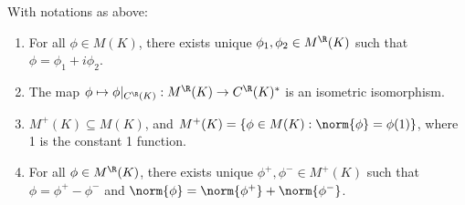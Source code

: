 \documentclass[a4paper]{article}
\begin{document}
\begin{nlemma}\label{lem:C(K)Space}
	With notations as above:
	\begin{enumerate}[label=(\roman*), nosep]
		\item For all $\phi\in M(K)$, there exists unique $\phi_1,\phi_2\in M^\R(K)$ such that $\phi=\phi_1+i\phi_2$.
		\item The map $\phi\mapsto\phi|_{C^\R(K)}:M^\R(K)\to C^\R(K)^*$ is an isometric isomorphism.
		\item $M^+(K)\subseteq M(K)$, and $M^+(K)=\{\phi\in M(K):\norm{\phi}=\phi(1)\}$, where 1 is the constant 1 function.
		\item For all $\phi\in M^\R(K)$, there exists unique $\phi^+,\phi^-\in M^+(K)$ such that $\phi=\phi^+-\phi^-$ and $\norm{\phi}=\norm{\phi^+}+\norm{\phi^-}$.
	\end{enumerate}
\end{nlemma}
\end{document}
